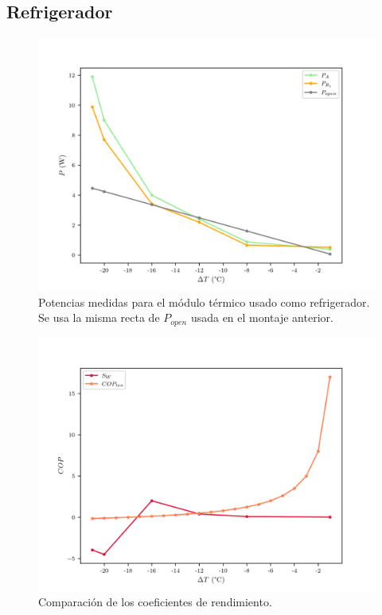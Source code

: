 \subsection{Refrigerador}

\begin{figure}[ht]
    \centering
    \includegraphics[width = 0.8\linewidth]{img/refri_powers.png}
    \caption{Potencias medidas para el módulo térmico usado como refrigerador. Se usa la misma recta de $P_{open}$ usada en el montaje anterior.}
    \label{fig:etas}
\end{figure}

\begin{figure}[ht]
    \centering
    \includegraphics[width = 0.8\linewidth]{img/refri_cops.png}
    \caption{Comparación de los coeficientes de rendimiento.}
    \label{fig:etas}
\end{figure}


